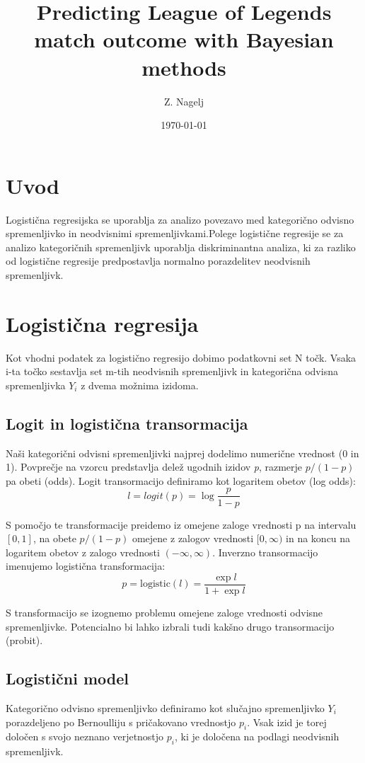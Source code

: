 \documentclass[letterpaper,11pt]{article}
\begin{document}



\title{\Large{Predicting League of Legends match outcome with Bayesian methods}}
\author{Z. Nagelj}
\date{\today}
\maketitle


\section{Uvod}
Logistična regresijska se uporablja za analizo povezavo med kategorično odvisno spremenljivko in neodvisnimi  spremenljivkami.Polege logistične regresije se za analizo kategoričnih spremenljivk uporablja diskriminantna analiza, ki za razliko od logistične regresije predpostavlja normalno porazdelitev neodvisnih spremenljivk.


\section{Logistična regresija}
Kot vhodni podatek za logistično regresijo dobimo podatkovni set N točk. Vsaka i-ta točko sestavlja set m-tih neodvisnih spremenljivk in kategorična odvisna spremenljivka $Y_i$ z dvema možnima izidoma.


\subsection{Logit in logistična transormacija}
Naši kategorični odvisni spremenljivki najprej dodelimo numerične vrednost (0 in 1). Povprečje na vzorcu predstavlja delež ugodnih izidov \emph{p}, razmerje $p/(1-p)$ pa obeti (odds). Logit transormacijo  definiramo kot logaritem obetov (log odds):
$$l = logit(p) = \log{\frac{p}{1-p}} $$

\noindent S pomočjo te transformacije preidemo iz omejene zaloge vrednosti p na intervalu $[0,1]$, na obete $p/(1-p)$ omejene z zalogov vrednosti $[0, \infty)$ in na koncu na logaritem obetov z zalogo vrednosti $(-\infty, \infty)$. Inverzno transormacijo imenujemo logistična transformacija:
$$p = \text{logistic}(l)=\frac{\exp{l}}{1 + \exp{l}}$$

\noindent S transformacijo se izognemo problemu omejene zaloge vrednosti odvisne spremenljivke. Potencialno bi lahko izbrali tudi kakšno drugo transormacijo (probit).

\subsection{Logistični model}
Kategorično odvisno spremenljivko definiramo kot slučajno spremenljivko $Y_i$porazdeljeno po Bernoulliju s pričakovano vrednostjo $p_i$. Vsak izid je torej določen s svojo neznano verjetnostjo $p_i$, ki je določena na podlagi neodvisnih spremenljivk.
\newpage
\end{document}
